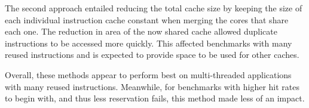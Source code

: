 The second approach entailed reducing the total cache size by keeping 
the size of each individual instruction cache constant when merging the 
cores that share each one. The reduction in area of the now shared cache 
allowed duplicate instructions to be accessed more quickly. This 
affected benchmarks with many reused instructions and is expected to 
provide space to be used for other caches.

Overall, these methods appear to perform best on multi-threaded 
applications with many reused instructions. Meanwhile, for benchmarks 
with higher hit rates to begin with, and thus less reservation fails, 
this method made less of an impact.
